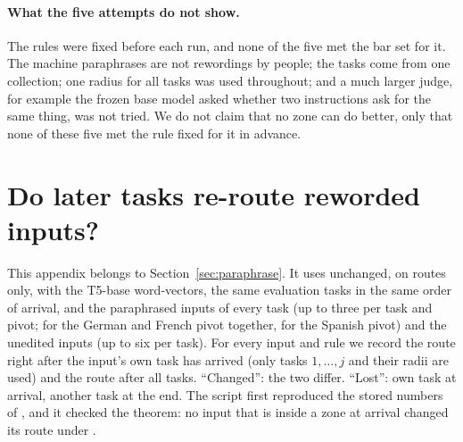 \paragraph{What the five attempts do not show.} The rules were fixed before each run, and none of the five met the bar set for it. The machine paraphrases are not rewordings by people; the tasks come from one
collection; one radius for all tasks was used throughout; and a much larger judge, for example the frozen base
model asked whether two instructions ask for the same thing, was not tried. We do not claim that no zone can do better, only that none of
these five met the rule fixed for it in advance.

\FloatBarrier
\section{Do later tasks re-route reworded inputs?}
\label{app:reroute}

This appendix belongs to Section~\ref{sec:paraphrase}. It uses \cert{} unchanged, on routes only, with the T5-base word-vectors, the same \WidenTasksEval{} evaluation tasks in the same
order of arrival, and the paraphrased inputs of every task (up to three per task and pivot; \RerouteInputs{} for the German and French pivot together, \RerouteInputsPivot{} for the Spanish pivot) and the unedited inputs (up to six per task).
For every input and rule we record the route right after the input's own task has arrived (only tasks $1,\dots,j$ and their radii are used) and the route after all \WidenTasksEval{} tasks. ``Changed'': the two differ.
``Lost'': own task at arrival, another task at the end. The script first reproduced the stored numbers of \cert{}, and it checked the theorem: no input that is inside a zone at arrival changed its route under \cert{}.

